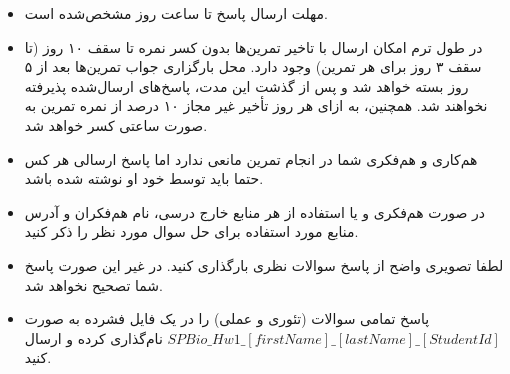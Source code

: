 \begin{itemize}
	\small
	\setlength\itemsep{0.05em}
	\item
	مهلت ارسال پاسخ تا ساعت  روز مشخص‌شده است.
	\item
	در طول ترم امکان ارسال با تاخیر تمرین‌ها بدون کسر نمره تا سقف ۱۰ روز (تا سقف ۳ روز برای هر تمرین) وجود دارد. محل بارگزاری جواب تمرین‌ها بعد از ۵ روز بسته خواهد شد و پس از گذشت این مدت، پاسخ‌های ارسال‌شده پذیرفته نخواهند ‌شد. همچنین، به ازای هر روز تأخیر غیر مجاز ۱۰ درصد از نمره تمرین به صورت ساعتی کسر خواهد شد.
	\item		
	هم‌کاری و هم‌فکری شما در انجام تمرین مانعی ندارد اما پاسخ ارسالی هر کس حتما باید توسط خود او نوشته شده‌ باشد. 
	\item
	در صورت هم‌فکری و یا استفاده از هر منابع خارج درسی، نام هم‌فکران و آدرس منابع مورد استفاده ‌برای حل سوال مورد نظر را ذکر‌ کنید.
	\item
	لطفا تصویری واضح از پاسخ سوالات نظری بارگذاری کنید. در غیر این صورت پاسخ شما تصحیح نخواهد شد.
	\item
	\footnotesize
پاسخ تمامی سوالات (تئوری و عملی) را در یک فایل فشرده به صورت 
\scriptsize
	$SPBio\_Hw1\_[firstName]\_[lastName]\_[StudentId]$
	\footnotesize
	نام‌گذاری کرده و ارسال کنید.
\end{itemize}